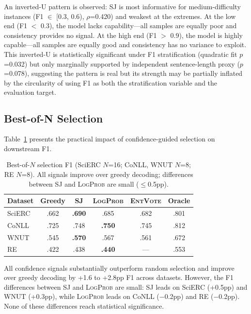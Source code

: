 \documentclass[11pt,a4paper]{article}
\newcommand{\SJ}{\textsc{SJ}}
\newcommand{\LP}{\textsc{LogProb}}
\newcommand{\EV}{\textsc{EntVote}}
\begin{document}
An inverted-U pattern is observed: \SJ{} is most informative for medium-difficulty instances (F1 $\in$ [0.3, 0.6), $\rho$=0.420) and weakest at the extremes.
At the low end (F1 $<$ 0.3), the model lacks capability---all samples are equally poor and consistency provides no signal.
At the high end (F1 $>$ 0.9), the model is highly capable---all samples are equally good and consistency has no variance to exploit.
This inverted-U is statistically significant under F1 stratification (quadratic fit $p$=0.032) but only marginally supported by independent sentence-length proxy ($p$=0.078), suggesting the pattern is real but its strength may be partially inflated by the circularity of using F1 as both the stratification variable and the evaluation target.

\subsection{Best-of-N Selection}
\label{sec:bestofn}

Table~\ref{tab:bestofn} presents the practical impact of confidence-guided selection on downstream F1.

\begin{table}[t]
\centering
\small
\begin{tabular}{l cccc c}
\toprule
\textbf{Dataset} & Greedy & \SJ{} & \LP{} & \EV{} & Oracle \\
\midrule
SciERC & .662 & \textbf{.690} & .685 & .682 & .801 \\
CoNLL & .725 & .748 & \textbf{.750} & .745 & .812 \\
WNUT & .545 & \textbf{.570} & .567 & .561 & .672 \\
\midrule
RE & .422 & .438 & \textbf{.440} & --- & .553 \\
\bottomrule
\end{tabular}
\caption{Best-of-$N$ selection F1 (SciERC $N$=16; CoNLL, WNUT $N$=8; RE $N$=8). All signals improve over greedy decoding; differences between \SJ{} and \LP{} are small ($\leq$0.5pp).}
\label{tab:bestofn}
\end{table}

All confidence signals substantially outperform random selection and improve over greedy decoding by +1.6 to +2.8pp F1 across datasets.
However, the F1 differences between \SJ{} and \LP{} are small: \SJ{} leads on SciERC (+0.5pp) and WNUT (+0.3pp), while \LP{} leads on CoNLL ($-$0.2pp) and RE ($-$0.2pp).
None of these differences reach statistical significance.
\end{document}
